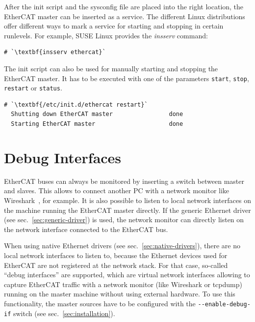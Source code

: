 \documentclass[a4paper,12pt,BCOR6mm,bibtotoc,idxtotoc]{scrbook}
\begin{document}
After the init script and the sysconfig file are placed into the right
location, the EtherCAT master can be inserted as a service. The different Linux
distributions offer different ways to mark a service for starting and stopping
in certain runlevels. For example, SUSE Linux provides the \textit{insserv}
command:

\begin{lstlisting}
# `\textbf{insserv ethercat}`
\end{lstlisting}

The init script can also be used for manually starting and stopping
the EtherCAT master. It has to be executed with one of the parameters
\texttt{start}, \texttt{stop}, \texttt{restart} or \texttt{status}.

\begin{lstlisting}[gobble=2]
  # `\textbf{/etc/init.d/ethercat restart}`
  Shutting down EtherCAT master                done
  Starting EtherCAT master                     done
\end{lstlisting}


\section{Debug Interfaces}
\label{sec:debug}

EtherCAT buses can always be monitored by inserting a switch between master
and slaves. This allows to connect another PC with a network monitor like
Wireshark~\cite{wireshark}, for example. It is also possible to listen to
local network interfaces on the machine running the EtherCAT master directly.
If the generic Ethernet driver (see sec.~\ref{sec:generic-driver}) is used,
the network monitor can directly listen on the network interface connected to
the EtherCAT bus.

When using native Ethernet drivers (see sec.~\ref{sec:native-drivers}), there
are no local network interfaces to listen to, because the Ethernet devices
used for EtherCAT are not registered at the network stack. For that case,
so-called ``debug interfaces'' are supported, which are virtual network
interfaces allowing to capture EtherCAT traffic with a network monitor (like
Wireshark or tcpdump) running on the master machine without using external
hardware. To use this functionality, the master sources have to be configured
with the \lstinline+--enable-debug-if+ switch (see
sec.~\ref{sec:installation}).
\end{document}
